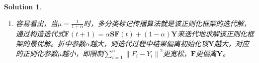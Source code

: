 \documentclass[a4paper,UTF8]{article}
\newtheorem*{solution}{Solution}
\numberwithin{equation}{section}
\begin{document}
\begin{solution}
\begin{enumerate}[$1.$]
\begin{align*}
       	&=\mu\sum_{i,j=1}^{n}(F_{ij}-Y_{ij})^{2}\\
       	&=\mu\left\|\mathbf{F}-\mathbf{Y}\right\|^{2}_{F}\\
       	&=tr(\mu(\mathbf{F}-\mathbf{Y})^T(\mathbf{F}-\mathbf{Y}))
       \end{align*}
   所以$$\mathcal{Q}(\mathbf{F})=tr(\mathbf{F}^T(\mathbf{I}-\mathbf{S})F+\mu(\mathbf{F}-\mathbf{Y})^T(\mathbf{F}-\mathbf{Y}))$$
   对其求导可得$$\frac{\partial\mathcal{Q}(\mathbf{F})}{\partial \mathbf{F}}=2(\mathbf{I}-\mathbf{S})\mathbf{F}+2\mu(\mathbf{F}-\mathbf{Y})$$
   令导数为$\mathbf{0}$，从而 $$\mathbf{F}^*=(1-\frac{1}{1+\mu})(\mathbf{I}-\frac{1}{1+\mu}\mathbf{S})\mathbf{Y}$$
	\item 容易看出，当$\mu=\frac{1}{1+\alpha}$时，多分类标记传播算法就是该正则化框架的迭代解，通过构造迭代式$\mathbf{F}(t+1)=\alpha\mathbf{S}\mathbf{F}(t)+(1-\alpha)\mathbf{Y}$来迭代地求解该正则化框架的最优解。折中参数$\alpha$越大，则迭代过程中结果偏离初始化项$\mathbf{Y}$越大，对应的正则化参数$\mu$越小，即限制$\sum_{i=1}^{n}\left\|F_{i}-Y_{i}\right\|^{2}$更宽松，$\mathbf{F}$更偏离$\mathbf{Y}$。
\end{enumerate}
\end{solution}
\end{document}
